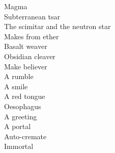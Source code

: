 Magma\\
Subterranean tsar\\
The scimitar and the neutron star\\
Makes from ether\\
Basalt weaver\\
Obsidian cleaver\\
Make believer\\

A rumble\\
A smile\\
A red tongue\\
Oesophagus\\
A greeting\\
A portal\\
Auto-cremate\\
Immortal\\

